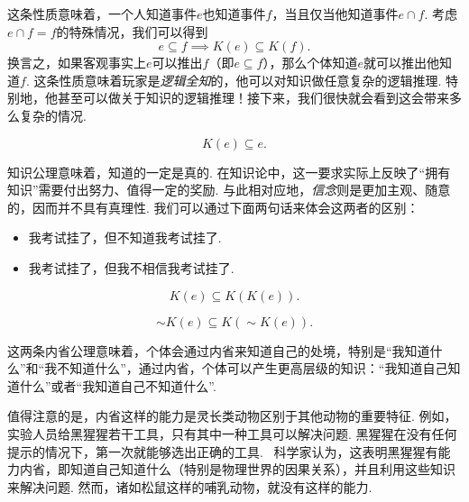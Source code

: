 这条性质意味着，一个人知道事件$e$也知道事件$f$，当且仅当他知道事件$e\cap f$. 考虑$e\cap f=f$的特殊情况，我们可以得到
\[e\subseteq f\implies K(e)\subseteq K(f).\]
换言之，如果客观事实上$e$可以推出$f$（即$e\subseteq f$），那么个体知道$e$就可以推出他知道$f$. 这条性质意味着玩家是\textit{逻辑全知}的，他可以对知识做任意复杂的逻辑推理. 特别地，他甚至可以做关于知识的逻辑推理！接下来，我们很快就会看到这会带来多么复杂的情况. 

\begin{proposition}
    \begin{equation}
        K(e)\subseteq e.\tag{K2}\label{eq:K2-knowledge}
    \end{equation}
\end{proposition}
知识公理意味着，知道的一定是真的. 在知识论中，这一要求实际上反映了“拥有知识”需要付出努力、值得一定的奖励. 与此相对应地，\textit{信念}则是更加主观、随意的，因而并不具有真理性. 我们可以通过下面两句话来体会这两者的区别：
    \begin{itemize}
        \item 我考试挂了，但不知道我考试挂了.
        \item 我考试挂了，但我不相信我考试挂了.
    \end{itemize}

\begin{proposition}[正内省公理]
    \begin{equation}
        K(e)\subseteq K(K(e)).\tag{K3}\label{eq:K3-positive-introspection}
    \end{equation}
\end{proposition}

\begin{proposition}[负内省公理]
    \begin{equation}
        \sim K(e)\subseteq K(\sim K(e)).\tag{K4}\label{eq:K4-negative-introspection}
    \end{equation}
\end{proposition}

这两条内省公理意味着，个体会通过内省来知道自己的处境，特别是“我知道什么”和“我不知道什么”，通过内省，个体可以产生更高层级的知识：“我知道自己知道什么”或者“我知道自己不知道什么”. 

值得注意的是，内省这样的能力是灵长类动物区别于其他动物的重要特征. 例如，实验人员给黑猩猩若干工具，只有其中一种工具可以解决问题. 黑猩猩在没有任何提示的情况下，第一次就能够选出正确的工具.~\cite{hanusChimpanzeeProblemsolvingContrasting2011} 科学家认为，这表明黑猩猩有能力内省，即知道自己知道什么（特别是物理世界的因果关系），并且利用这些知识来解决问题. 然而，诸如松鼠这样的哺乳动物，就没有这样的能力.~\cite{tomaselloEvolutionAgency2022}

